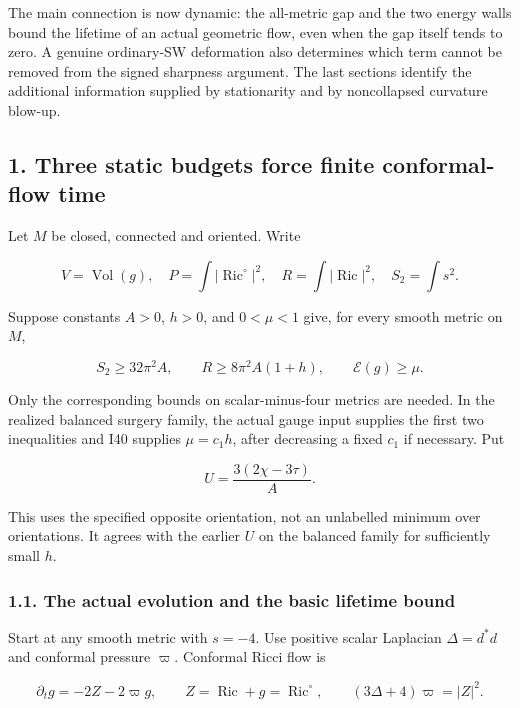 \documentclass[
  10pt,
]{article}
\begin{document}
The main connection is now dynamic: the all-metric gap and the two
energy walls bound the lifetime of an actual geometric flow, even when
the gap itself tends to zero. A genuine ordinary-SW deformation also
determines which term cannot be removed from the signed sharpness
argument. The last sections identify the additional information supplied
by stationarity and by noncollapsed curvature blow-up.

\hypertarget{three-static-budgets-force-finite-conformal-flow-time}{%
\subsection{1. Three static budgets force finite conformal-flow
time}\label{three-static-budgets-force-finite-conformal-flow-time}}

Let \(M\) be closed, connected and oriented. Write

\[
 V=\operatorname{Vol}(g),\quad P=\int|\operatorname{Ric}^{\circ}|^2,
 \quad R=\int|\operatorname{Ric}|^2,
 \quad S_2=\int s^2.
\]

Suppose constants \(A>0\), \(h>0\), and \(0<\mu<1\) give, for every
smooth metric on \(M\),

\[
 S_2\ge32\pi^2A,\qquad R\ge8\pi^2A(1+h),
 \qquad \mathcal E(g)\ge\mu.                         \tag{1.1}
\]

Only the corresponding bounds on scalar-minus-four metrics are needed.
In the realized balanced surgery family, the actual gauge input supplies
the first two inequalities and I40 supplies \(\mu=c_1h\), after
decreasing a fixed \(c_1\) if necessary. Put

\[
 U=\frac{3(2\chi-3\tau)}A.
\]

This uses the specified opposite orientation, not an unlabelled minimum
over orientations. It agrees with the earlier \(U\) on the balanced
family for sufficiently small \(h\).

\hypertarget{the-actual-evolution-and-the-basic-lifetime-bound}{%
\subsubsection{1.1. The actual evolution and the basic lifetime
bound}\label{the-actual-evolution-and-the-basic-lifetime-bound}}

Start at any smooth metric with \(s=-4\). Use positive scalar Laplacian
\(\Delta=d^*d\) and conformal pressure \(\varpi\). Conformal Ricci flow
is

\[
 \partial_tg=-2Z-2\varpi g,\qquad
 Z=\operatorname{Ric}+g=\operatorname{Ric}^{\circ},\qquad
 (3\Delta+4)\varpi=|Z|^2.                            \tag{1.2}
\]
\end{document}
